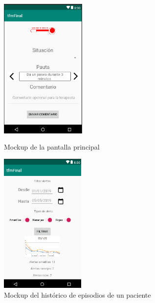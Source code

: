\begin{figure}[h]
    \centering
    \begin{minipage}{.45\textwidth}
        \centering
        \includegraphics[width=0.8\linewidth, height=7cm]{Imagenes/anxA14.png}
        \caption[Mockup de la pantalla principal]{Mockup de la pantalla principal}
        \label{fig:c4:mockup23}
    \end{minipage}
    \hfill\vline\hfill
    \begin{minipage}{.45\textwidth}
        \centering
        \includegraphics[width=0.8\linewidth, height=7cm]{Imagenes/anxA15.png}
        \caption[Mockup del histórico de episodios de un paciente]{Mockup del histórico de episodios de un paciente}
        \label{fig:c4:mockup24}
    \end{minipage}
\end{figure}

